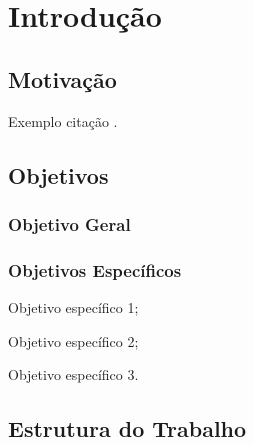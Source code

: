 \chapter{Introdução}
\label{ch:introducao}

\section{M\lowercase{otiva\c{c}\~{a}o}}
\label{sec:motivacao}

Exemplo citação \cite{lamport1986latex}.

\section{O\lowercase{bjetivos}}
\label{sec:objetivos}

\subsection{Objetivo Geral}
\label{subsec:objetivo-geral}

\subsection{Objetivos Específicos}
\label{subsec:objetivos-especificos}
	\begin{alineas}
	    \item Objetivo específico 1;
		\item Objetivo específico 2;
		\item Objetivo específico 3.
	\end{alineas}

\section{E\lowercase{strutura do} T\lowercase{rabalho}}
\label{sec:estrutura-do-trabalho}